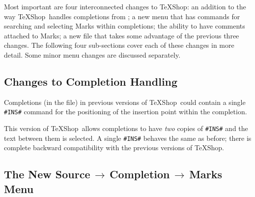 \documentclass[11pt]{article}
\newcommand{\mnu}[1]{\textsf{#1}}
\newcommand{\To}{\,\(\to\)\,}
\newcommand{\TS}{\textsf{\TeX Shop}}
\begin{document}
Most important are four interconnected changes to \TS: an addition to the way \TS\ handles completions from ; a new menu that has commands for searching and selecting Marks within completions; the ability to have comments attached to Marks; a new  file that takes some advantage of the previous three changes. The following four sub-sections cover each of these changes in more detail. Some minor menu changes are discussed separately.

\subsection*{Changes to Completion Handling}

Completions (in the  file) in previous versions of \TS\ could contain a single \verb|#INS#| command for the positioning of the insertion point within the completion.

This version of \TS\ allows completions to have \emph{two} copies of \verb|#INS#| and the text between them is selected. A single \verb|#INS#| behaves the same as before; there is complete backward compatibility with the previous versions of \TS.

\subsection*{The New \mnu{Source}\To\mnu{Completion}\To\mnu{Marks} Menu}
\end{document}
